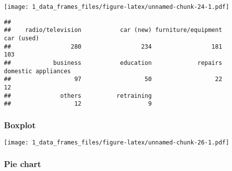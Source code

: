 \documentclass[
]{article}
\newenvironment{Shaded}{\begin{snugshade}}{\end{snugshade}}
\newcommand{\AttributeTok}[1]{\textcolor[rgb]{0.77,0.63,0.00}{#1}}
\newcommand{\ConstantTok}[1]{\textcolor[rgb]{0.00,0.00,0.00}{#1}}
\newcommand{\FunctionTok}[1]{\textcolor[rgb]{0.00,0.00,0.00}{#1}}
\newcommand{\NormalTok}[1]{#1}
\newcommand{\OtherTok}[1]{\textcolor[rgb]{0.56,0.35,0.01}{#1}}
\newcommand{\SpecialCharTok}[1]{\textcolor[rgb]{0.00,0.00,0.00}{#1}}
\newcommand{\StringTok}[1]{\textcolor[rgb]{0.31,0.60,0.02}{#1}}
\begin{document}
\texttt{[image: 1\_data\_frames\_files/figure-latex/unnamed-chunk-24-1.pdf]}

\begin{Shaded}
\end{Shaded}

\begin{verbatim}
## 
##    radio/television           car (new) furniture/equipment          car (used) 
##                 280                 234                 181                 103 
##            business           education             repairs domestic appliances 
##                  97                  50                  22                  12 
##              others          retraining 
##                  12                   9
\end{verbatim}

\hypertarget{boxplot}{%
\subsubsection{Boxplot}\label{boxplot}}

\begin{Shaded}
\end{Shaded}

\texttt{[image: 1\_data\_frames\_files/figure-latex/unnamed-chunk-26-1.pdf]}

\hypertarget{pie-chart}{%
\subsubsection{Pie chart}\label{pie-chart}}

\begin{Shaded}
\end{Shaded}
\end{document}
